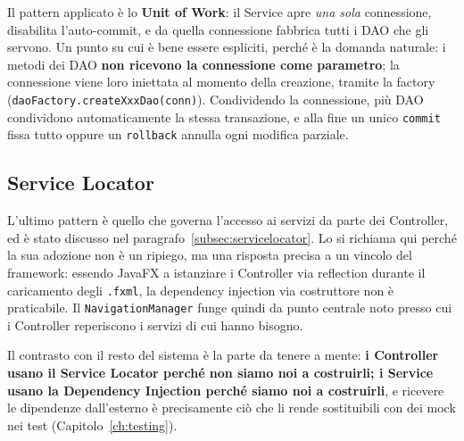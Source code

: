 Il pattern applicato è lo \textbf{Unit of Work}: il Service apre \emph{una sola} connessione, disabilita l'auto-commit, e da quella connessione fabbrica tutti i DAO che gli servono. Un punto su cui è bene essere espliciti, perché è la domanda naturale: i metodi dei DAO \textbf{non ricevono la connessione come parametro}; la connessione viene loro iniettata al momento della creazione, tramite la factory (\texttt{daoFactory.createXxxDao(conn)}). Condividendo la connessione, più DAO condividono automaticamente la stessa transazione, e alla fine un unico \texttt{commit} fissa tutto oppure un \texttt{rollback} annulla ogni modifica parziale.

\subsection{Service Locator}

L'ultimo pattern è quello che governa l'accesso ai servizi da parte dei Controller, ed è stato discusso nel paragrafo~\ref{subsec:servicelocator}. Lo si richiama qui perché la sua adozione non è un ripiego, ma una risposta precisa a un vincolo del framework: essendo JavaFX a istanziare i Controller via reflection durante il caricamento degli \texttt{.fxml}, la dependency injection via costruttore non è praticabile. Il \texttt{NavigationManager} funge quindi da punto centrale noto presso cui i Controller reperiscono i servizi di cui hanno bisogno.

Il contrasto con il resto del sistema è la parte da tenere a mente: \textbf{i Controller usano il Service Locator perché non siamo noi a costruirli; i Service usano la Dependency Injection perché siamo noi a costruirli}, e ricevere le dipendenze dall'esterno è precisamente ciò che li rende sostituibili con dei mock nei test (Capitolo~\ref{ch:testing}).
